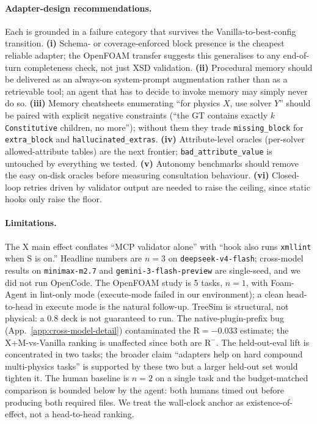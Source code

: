 \documentclass{article}
\begin{document}
\paragraph{Adapter-design recommendations.} Each is grounded in a failure category that survives the Vanilla-to-best-config transition. \textbf{(i)} Schema- or coverage-enforced block presence is the cheapest reliable adapter; the OpenFOAM transfer suggests this generalises to any end-of-turn completeness check, not just XSD validation. \textbf{(ii)} Procedural memory should be delivered as an always-on system-prompt augmentation rather than as a retrievable tool; an agent that has to decide to invoke memory may simply never do so. \textbf{(iii)} Memory cheatsheets enumerating ``for physics $X$, use solver $Y$'' should be paired with explicit negative constraints (``the GT contains exactly $k$ \texttt{Constitutive} children, no more''); without them they trade \texttt{missing\_block} for \texttt{extra\_block} and \texttt{hallucinated\_extras}. \textbf{(iv)} Attribute-level oracles (per-solver allowed-attribute tables) are the next frontier; \texttt{bad\_attribute\_value} is untouched by everything we tested. \textbf{(v)} Autonomy benchmarks should remove the easy on-disk oracles before measuring consultation behaviour. \textbf{(vi)} Closed-loop retries driven by validator output are needed to raise the ceiling, since static hooks only raise the floor.

\paragraph{Limitations.} The $\mathrm{X}$ main effect conflates ``MCP validator alone'' with ``hook also runs \texttt{xmllint} when $\mathrm{S}$ is on.'' Headline numbers are $n=3$ on \texttt{deepseek-v4-flash}; cross-model results on \texttt{minimax-m2.7} and \texttt{gemini-3-flash-preview} are single-seed, and we did not run OpenCode. The OpenFOAM study is 5 tasks, $n=1$, with Foam-Agent in lint-only mode (execute-mode failed in our environment); a clean head-to-head in execute mode is the natural follow-up. TreeSim is structural, not physical: a $0.8$ deck is not guaranteed to run. The native-plugin-prefix bug (App.~\ref{app:cross-model-detail}) contaminated the $\mathrm{R}=-0.033$ estimate; the X+M-vs-Vanilla ranking is unaffected since both are $\mathrm{R^-}$. The held-out-eval lift is concentrated in two tasks; the broader claim ``adapters help on hard compound multi-physics tasks'' is supported by these two but a larger held-out set would tighten it. The human baseline is $n=2$ on a single task and the budget-matched comparison is bounded below by the agent: both humans timed out before producing both required files. We treat the wall-clock anchor as existence-of-effect, not a head-to-head ranking.
\end{document}
